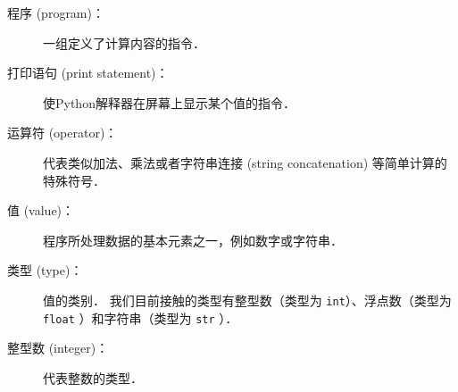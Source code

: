 \begin{description}

\item[程序 (program)：] 一组定义了计算内容的指令．
  


\item[打印语句 (print statement)：]  使Python解释器在屏幕上显示某个值的指令．
  
  


\item[运算符 (operator)：]  代表类似加法、乘法或者字符串连接 (string concatenation) 等简单计算的特殊符号．
  


\item[值 (value)：]  程序所处理数据的基本元素之一，例如数字或字符串．
  


\item[类型 (type)：] 值的类别． 我们目前接触的类型有整型数（类型为 \lstinline{int}）、浮点数（类型为 \lstinline{float} ）和字符串（类型为 \lstinline{str} ）．
  


\item[整型数 (integer)：] 代表整数的类型．
  



\end{description}
